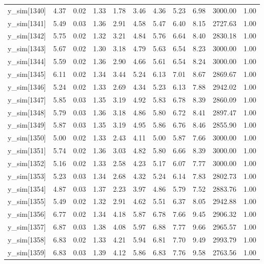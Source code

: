 \begin{table}[ht]
\begin{tabular}{rrrrrrrrrrr}
  y\_sim[1340] & 4.37 & 0.02 & 1.33 & 1.78 & 3.46 & 4.36 & 5.23 & 6.98 & 3000.00 & 1.00 \\ 
  y\_sim[1341] & 5.49 & 0.03 & 1.36 & 2.91 & 4.58 & 5.47 & 6.40 & 8.15 & 2727.63 & 1.00 \\ 
  y\_sim[1342] & 5.75 & 0.02 & 1.32 & 3.21 & 4.84 & 5.76 & 6.64 & 8.40 & 2830.18 & 1.00 \\ 
  y\_sim[1343] & 5.67 & 0.02 & 1.30 & 3.18 & 4.79 & 5.63 & 6.54 & 8.23 & 3000.00 & 1.00 \\ 
  y\_sim[1344] & 5.59 & 0.02 & 1.36 & 2.90 & 4.66 & 5.61 & 6.54 & 8.24 & 3000.00 & 1.00 \\ 
  y\_sim[1345] & 6.11 & 0.02 & 1.34 & 3.44 & 5.24 & 6.13 & 7.01 & 8.67 & 2869.67 & 1.00 \\ 
  y\_sim[1346] & 5.24 & 0.02 & 1.33 & 2.69 & 4.34 & 5.23 & 6.13 & 7.88 & 2942.02 & 1.00 \\ 
  y\_sim[1347] & 5.85 & 0.03 & 1.35 & 3.19 & 4.92 & 5.83 & 6.78 & 8.39 & 2860.09 & 1.00 \\ 
  y\_sim[1348] & 5.79 & 0.03 & 1.36 & 3.18 & 4.86 & 5.80 & 6.72 & 8.41 & 2897.47 & 1.00 \\ 
  y\_sim[1349] & 5.87 & 0.03 & 1.35 & 3.19 & 4.95 & 5.86 & 6.76 & 8.46 & 2855.90 & 1.00 \\ 
  y\_sim[1350] & 5.00 & 0.02 & 1.33 & 2.43 & 4.11 & 5.00 & 5.87 & 7.66 & 3000.00 & 1.00 \\ 
  y\_sim[1351] & 5.74 & 0.02 & 1.36 & 3.03 & 4.82 & 5.80 & 6.66 & 8.39 & 3000.00 & 1.00 \\ 
  y\_sim[1352] & 5.16 & 0.02 & 1.33 & 2.58 & 4.23 & 5.17 & 6.07 & 7.77 & 3000.00 & 1.00 \\ 
  y\_sim[1353] & 5.23 & 0.03 & 1.34 & 2.68 & 4.32 & 5.24 & 6.14 & 7.83 & 2802.73 & 1.00 \\ 
  y\_sim[1354] & 4.87 & 0.03 & 1.37 & 2.23 & 3.97 & 4.86 & 5.79 & 7.52 & 2883.76 & 1.00 \\ 
  y\_sim[1355] & 5.49 & 0.02 & 1.32 & 2.91 & 4.62 & 5.51 & 6.37 & 8.05 & 2942.88 & 1.00 \\ 
  y\_sim[1356] & 6.77 & 0.02 & 1.34 & 4.18 & 5.87 & 6.78 & 7.66 & 9.45 & 2906.32 & 1.00 \\ 
  y\_sim[1357] & 6.87 & 0.03 & 1.38 & 4.08 & 5.97 & 6.88 & 7.77 & 9.66 & 2965.57 & 1.00 \\ 
  y\_sim[1358] & 6.83 & 0.02 & 1.33 & 4.21 & 5.94 & 6.81 & 7.70 & 9.49 & 2993.79 & 1.00 \\ 
  y\_sim[1359] & 6.83 & 0.03 & 1.39 & 4.12 & 5.86 & 6.83 & 7.76 & 9.58 & 2763.56 & 1.00 \\ 

\end{tabular}
\end{table}
